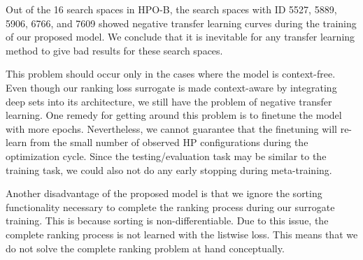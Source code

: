 \documentclass[12pt, twoside, ngerman]{report}
\begin{document}
Out of the 16 search spaces in HPO-B, the search spaces with ID 5527, 5889, 5906, 6766, and 7609 showed negative transfer learning curves during the training of our proposed model. 
We conclude that it is inevitable for any transfer learning method to give bad results for these search spaces.

This problem should occur only in the cases where the model is context-free.
Even though our ranking loss surrogate is made context-aware by integrating deep sets into its architecture, we still have the problem of negative transfer learning.
One remedy for getting around this problem is to finetune the model with more epochs.
Nevertheless, we cannot guarantee that the finetuning will re-learn from the small number of observed HP configurations during the optimization cycle.
Since the testing/evaluation task may be similar to the training task, we could also not do any early stopping during meta-training.

Another disadvantage of the proposed model is that we ignore the sorting functionality necessary to complete the ranking process during our surrogate training. This is because sorting is non-differentiable.
Due to this issue, the complete ranking process is not learned with the listwise loss. This means that we do not solve the complete ranking problem at hand conceptually.
\end{document}
